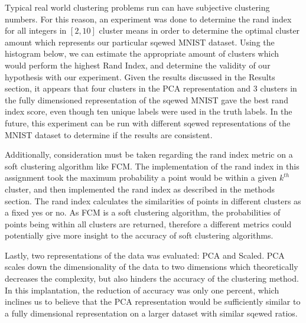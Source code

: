 Typical real world clustering problems run can have subjective clustering numbers. For this reason, an experiment was done to determine the rand index for all integers in $[2,10]$ cluster means in order to determine the optimal cluster amount which represents our particular sqewed MNIST dataset. Using the histogram below, we can estimate the appropriate amount of clusters which would perform the highest Rand Index, and determine the validity of our hypothesis with our experiment. Given the results discussed in the Results section, it appears that four clusters in the PCA representation and 3 clusters in the fully dimensioned representation of the sqewed MNIST gave the best rand index score, even though ten unique labels were used in the truth labels. In the future, this experiment can be run with different sqewed representations of the MNIST dataset to determine if the results are consistent. \par

Additionally, consideration must be taken regarding the rand index metric on a soft clustering algorithm like FCM. The implementation of the rand index in this assignment took the maximum probability a point would be within a given $k^{th}$ cluster, and then implemented the rand index as described in the methods section. The rand index calculates the similarities of points in different clusters as a fixed yes or no. As FCM is a soft clustering algorithm, the probabilities of points being within all clusters are returned, therefore a different metrics could potentially give more insight to the accuracy of soft clustering algorithms. \par

Lastly, two representations of the data was evaluated: PCA and Scaled. PCA scales down the dimensionality of the data to two dimensions which theoretically decreases the complexity, but also hinders the accuracy of the clustering method. In this implantation, the reduction of accuracy was only one percent, which inclines us to believe that the PCA representation would be sufficiently similar to a fully dimensional representation on a larger dataset with similar sqewed ratios. 
